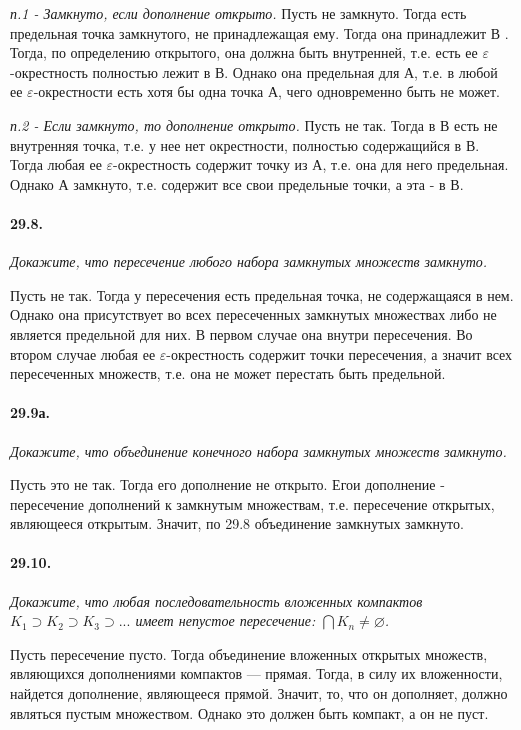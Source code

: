 \documentclass{book}
\begin{document}
\textit{п.1 - Замкнуто, если дополнение открыто.} Пусть не замкнуто. Тогда есть предельная точка замкнутого, не принадлежащая ему. Тогда она принадлежит В . Тогда, по определению открытого, она должна быть внутренней, т.е. есть ее $\varepsilon$-окрестность полностью лежит в В. Однако она предельная для А, т.е. в любой ее $\varepsilon$-окрестности есть хотя бы одна точка А, чего одновременно быть не может.

\textit{п.2 - Если замкнуто, то дополнение открыто.} Пусть не так. Тогда в В есть не внутренняя точка, т.е. у нее нет окрестности, полностью содержащийся в В. Тогда любая ее $\varepsilon$-окрестность содержит точку из А, т.е. она для него предельная. Однако А замкнуто, т.е. содержит все свои предельные точки, а эта - в В.

\paragraph{29.8.}
\textit{Докажите, что пересечение любого набора замкнутых множеств замкнуто.}

Пусть не так. Тогда у пересечения есть предельная точка, не содержащаяся в нем. Однако она присутствует во всех пересеченных замкнутых множествах либо не является предельной для них. В первом случае она внутри пересечения. Во втором случае любая ее $\varepsilon$-окрестность содержит точки пересечения, а значит всех пересеченных множеств, т.е. она не может перестать быть предельной.

\paragraph{29.9а.}
\textit{Докажите, что объединение конечного набора замкнутых множеств замкнуто.}

Пусть это не так. Тогда его дополнение не открыто. Егои дополнение - пересечение дополнений к замкнутым множествам, т.е. пересечение открытых, являющееся открытым. Значит, по 29.8 объединение замкнутых замкнуто.

\paragraph{29.10.}
\textit{Докажите, что любая последовательность вложенных компактов $K_1 \supset K_2 \supset K_3 \supset ... $ имеет непустое пересечение: $\bigcap K_n \neq \varnothing $.}

Пусть пересечение пусто. Тогда объединение вложенных открытых множеств, являющихся дополнениями компактов --- прямая. Тогда, в силу их вложенности, найдется дополнение, являющееся прямой. Значит, то, что он дополняет, должно являться пустым множеством. Однако это должен быть компакт, а он не пуст. 
\end{document}
